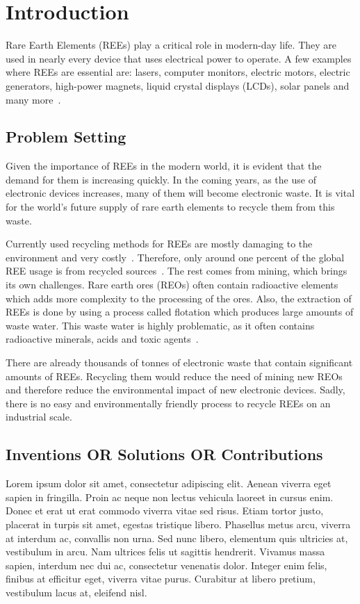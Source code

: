 \chapter{Introduction}

Rare Earth Elements (REEs) play a critical role in modern-day life.
They are used in nearly every device that uses electrical power to operate.
A few examples where REEs are essential are: lasers, computer monitors, electric motors, electric generators, high-power magnets, liquid crystal displays (LCDs), solar panels and many more~\cite{usageofrees}.


\section{Problem Setting\authorA{}}

Given the importance of REEs in the modern world, it is evident that the demand for them is increasing quickly.
In the coming years, as the use of electronic devices increases, many of them will become electronic waste.
It is vital for the world's future supply of rare earth elements to recycle them from this waste.

Currently used recycling methods for REEs are mostly damaging to the environment and very costly~\cite{recyclingcurrent}.
Therefore, only around one percent of the global REE usage is from recycled sources~\cite{currentrecyclingnumbers}.
The rest comes from mining, which brings its own challenges.
Rare earth ores (REOs) often contain radioactive elements which adds more complexity to the processing of the ores.
Also, the extraction of REEs is done by using a process called flotation which produces large amounts of waste water.
This waste water is highly problematic, as it often contains radioactive minerals, acids and toxic agents~\cite{reeenvimpact}.

There are already thousands of tonnes of electronic waste that contain significant amounts of REEs. Recycling them would reduce the need of mining new REOs and therefore reduce the environmental impact of new electronic devices.
Sadly, there is no easy and environmentally friendly process to recycle REEs on an industrial scale.


\section{Inventions OR Solutions OR Contributions}

Lorem ipsum dolor sit amet, consectetur adipiscing elit. Aenean viverra eget sapien in fringilla. Proin ac neque non lectus vehicula laoreet in cursus enim. Donec et erat ut erat commodo viverra vitae sed risus. Etiam tortor justo, placerat in turpis sit amet, egestas tristique libero. Phasellus metus arcu, viverra at interdum ac, convallis non urna. Sed nunc libero, elementum quis ultricies at, vestibulum in arcu. Nam ultrices felis ut sagittis hendrerit. Vivamus massa sapien, interdum nec dui ac, consectetur venenatis dolor. Integer enim felis, finibus at efficitur eget, viverra vitae purus. Curabitur at libero pretium, vestibulum lacus at, eleifend nisl.


